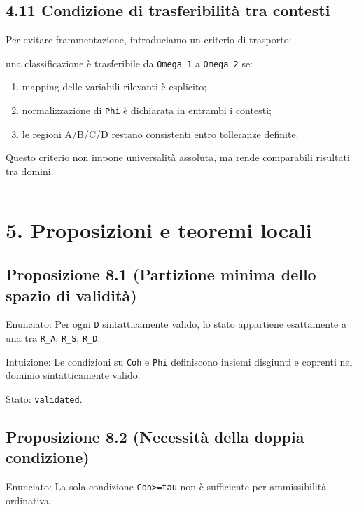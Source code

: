 \subsection{4.11 Condizione di trasferibilità tra contesti}

Per evitare frammentazione, introduciamo un criterio di trasporto:

una classificazione è trasferibile da \texttt{Omega\_1} a \texttt{Omega\_2} se:

\begin{enumerate}
\def\labelenumi{\arabic{enumi}.}
\tightlist
\item
  mapping delle variabili rilevanti è esplicito;
\item
  normalizzazione di \texttt{Phi} è dichiarata in entrambi i contesti;
\item
  le regioni A/B/C/D restano consistenti entro tolleranze definite.
\end{enumerate}

Questo criterio non impone universalità assoluta, ma rende comparabili risultati tra domini.

\begin{center}\rule{0.5\linewidth}{0.5pt}\end{center}

\section{5. Proposizioni e teoremi locali}

\subsection{Proposizione 8.1 (Partizione minima dello spazio di validità)}

Enunciato:
Per ogni \texttt{D} sintatticamente valido, lo stato appartiene esattamente a una tra \texttt{R\_A}, \texttt{R\_S}, \texttt{R\_D}.

Intuizione:
Le condizioni su \texttt{Coh} e \texttt{Phi} definiscono insiemi disgiunti e coprenti nel dominio sintatticamente valido.

Stato: \texttt{validated}.

\subsection{Proposizione 8.2 (Necessità della doppia condizione)}

Enunciato:
La sola condizione \texttt{Coh\textgreater{}=tau} non è sufficiente per ammissibilità ordinativa.

